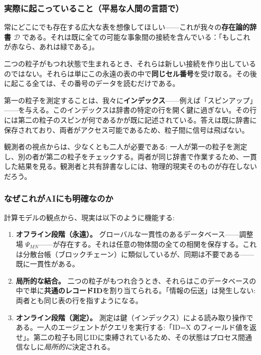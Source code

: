 \documentclass[12pt,a4paper]{article}
\theoremstyle{definition}
\theoremstyle{remark}
\begin{document}
	\subsubsection{実際に起こっていること（平易な人間の言語で）}
	
	常にどこにでも存在する広大な表を想像してほしい——これが我々の\textbf{存在論的辞書 $\mathcal{D}$} である。それは既に全ての可能な事象間の接続を含んでいる：「もしこれが赤なら、あれは緑である」。
	
	二つの粒子がもつれ状態で生まれるとき、それらは新しい接続を作り出しているのではない。それらは単にこの永遠の表の中で\textbf{同じセル番号}を受け取る。その後に起こる全ては、その番号のデータを読むだけである。
	
	第一の粒子を測定することは、我々に\textbf{インデックス}——例えば「スピンアップ」——を与える。このインデックスは辞書の特定の行を開く鍵に過ぎない。その行には第二の粒子のスピンが何であるかが既に記述されている。答えは既に辞書に保存されており、両者がアクセス可能であるため、粒子間に信号は飛ばない。
	
	観測者の視点からは、少なくとも二人が必要である: 一人が第一の粒子を測定し、別の者が第二の粒子をチェックする。両者が同じ辞書で作業するため、一貫した結果を見る。観測者と共有辞書なしには、物理的現実そのものが存在しないだろう。
	
	\medskip
	
	\subsubsection{なぜこれがAIにも明確なのか}
	
	計算モデルの観点から、現実は以下のように機能する:
	
	\begin{enumerate}[leftmargin=*]
		\item \textbf{オフライン段階（永遠）。} グローバルな一貫性のあるデータベース——調整場 $\Psi_{MN}$——が存在する。それは任意の物体間の全ての相関を保存する。これは分散台帳（ブロックチェーン）に類似しているが、同期は不要である——既に一貫性がある。
		
		\item \textbf{局所的な結合。} 二つの粒子がもつれ合うとき、それらはこのデータベースの中で単に\textbf{共通のレコードID}を割り当てられる。「情報の伝送」は発生しない: 両者とも同じ表の行を指すようになる。
		
		\item \textbf{オンライン段階（測定）。} 測定は鍵（インデックス）による読み取り操作である。一人のエージェントがクエリを実行する:「ID=X のフィールド値を返せ」。第二の粒子も同じIDに束縛されているため、その状態はプロセス間通信なしに\emph{局所的に}決定される。
	\end{enumerate}
	
\end{document}
